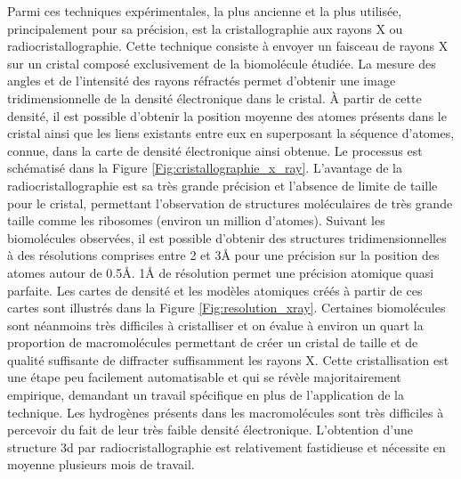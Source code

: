 Parmi ces techniques expérimentales, la plus ancienne et la plus utilisée, principalement pour sa précision, est la cristallographie aux rayons X ou radiocristallographie. Cette technique consiste à envoyer un faisceau de rayons X sur un cristal composé exclusivement de la biomolécule étudiée. La mesure des angles et de l'intensité des rayons réfractés permet d'obtenir une image tridimensionnelle de la densité électronique dans le cristal. À partir de cette densité, il est possible d'obtenir la position moyenne des atomes présents dans le cristal ainsi que les liens existants entre eux en superposant la séquence d'atomes, connue, dans la carte de densité électronique ainsi obtenue. Le processus est schématisé dans la Figure \ref{Fig:cristallographie_x_ray}.
L'avantage de la radiocristallographie est sa très grande précision et l'absence de limite de taille pour le cristal, permettant l'observation de structures moléculaires de très grande taille comme les ribosomes (environ un million d'atomes). Suivant les biomolécules observées, il est possible d'obtenir des structures tridimensionnelles à des résolutions comprises entre 2 et 3\r{A} pour une précision sur la position des atomes autour de 0.5\r{A}. 1\r{A} de résolution permet une précision atomique quasi parfaite. Les cartes de densité et les modèles atomiques créés à partir de ces cartes sont illustrés dans la Figure \ref{Fig:resolution_xray}. 
Certaines biomolécules sont néanmoins très difficiles à cristalliser et on évalue à environ un quart la proportion de macromolécules permettant de créer un cristal de taille et de qualité suffisante de diffracter suffisamment les rayons X. Cette cristallisation est une étape peu facilement automatisable et qui se révèle majoritairement empirique, demandant un travail spécifique en plus de l'application de la technique. Les hydrogènes présents dans les macromolécules sont très difficiles à percevoir du fait de leur très faible densité électronique. L'obtention d'une structure 3d par radiocristallographie est relativement fastidieuse et nécessite en moyenne plusieurs mois de travail.

